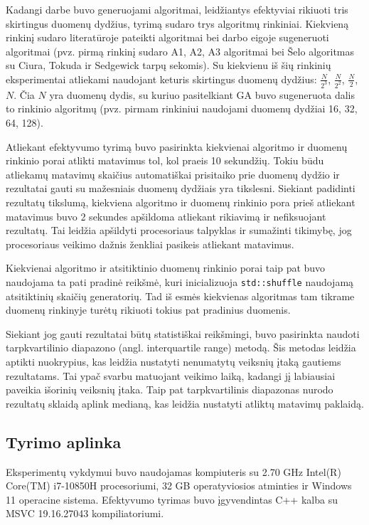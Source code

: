 \documentclass{VUMIFInfBakalaurinis}
\begin{document}
Kadangi darbe buvo generuojami algoritmai, leidžiantys efektyviai rikiuoti tris skirtingus duomenų dydžius, tyrimą sudaro trys algoritmų rinkiniai.
Kiekvieną rinkinį sudaro literatūroje pateikti algoritmai bei darbo eigoje sugeneruoti algoritmai
(pvz. pirmą rinkinį sudaro A1, A2, A3 algoritmai bei Šelo algoritmas su Ciura, Tokuda ir Sedgewick tarpų sekomis).
Su kiekvienu iš šių rinkinių eksperimentai atliekami naudojant keturis skirtingus duomenų dydžius: $\frac{N}{2^3}$, $\frac{N}{2^2}$, $\frac{N}{2}$, $N$.
Čia $N$ yra duomenų dydis, su kuriuo pasitelkiant GA buvo sugeneruota dalis to rinkinio algoritmų (pvz. pirmam rinkiniui naudojami duomenų dydžiai 16, 32, 64, 128).

Atliekant efektyvumo tyrimą buvo pasirinkta kiekvienai algoritmo ir duomenų rinkinio porai
atlikti matavimus tol, kol praeis 10 sekundžių.
Tokiu būdu atliekamų matavimų skaičius automatiškai prisitaiko prie duomenų dydžio
ir rezultatai gauti su mažesniais duomenų dydžiais yra tikslesni.
Siekiant padidinti rezultatų tikslumą, kiekviena algoritmo ir duomenų rinkinio pora
prieš atliekant matavimus buvo 2 sekundes apšildoma atliekant rikiavimą ir nefiksuojant rezultatų.
Tai leidžia apšildyti procesoriaus talpyklas ir sumažinti tikimybę,
jog procesoriaus veikimo dažnis ženkliai pasikeis atliekant matavimus.

Kiekvienai algoritmo ir atsitiktinio duomenų rinkinio porai taip pat buvo naudojama ta pati pradinė reikšmė,
kuri inicializuoja \verb|std::shuffle| naudojamą atsitiktinių skaičių generatorių.
Tad iš esmės kiekvienas algoritmas tam tikrame duomenų rinkinyje turėtų rikiuoti tokius pat pradinius duomenis.

Siekiant jog gauti rezultatai būtų statistiškai reikšmingi, buvo pasirinkta naudoti tarpkvartilinio diapazono (angl. interquartile range) metodą.
Šis metodas leidžia aptikti nuokrypius, kas leidžia nustatyti nenumatytų veiksnių įtaką gautiems rezultatams.
Tai ypač svarbu matuojant veikimo laiką, kadangi jį labiausiai paveikia išorinių veiksnių įtaka.
Taip pat tarpkvartilinis diapazonas nurodo rezultatų sklaidą aplink medianą,
kas leidžia nustatyti atliktų matavimų paklaidą.


\subsection{Tyrimo aplinka}

Eksperimentų vykdymui buvo naudojamas kompiuteris su 2.70 GHz Intel(R) Core(TM) i7-10850H procesoriumi,
32 GB operatyviosios atminties ir Windows 11 operacine sistema.
Efektyvumo tyrimas buvo įgyvendintas C++ kalba su MSVC 19.16.27043 kompiliatoriumi.
\end{document}
